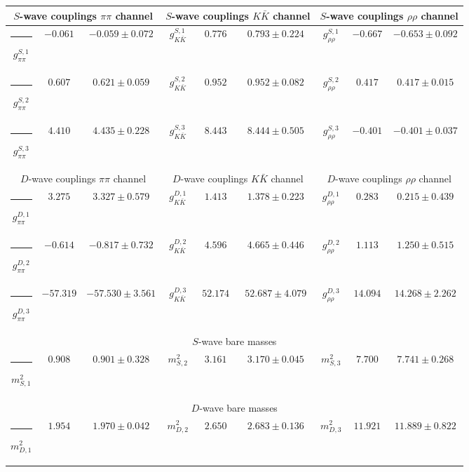 \begin{table}[h]
\begin{ruledtabular}
\begin{tabular}{c c c c c c c c c}
\multicolumn{3}{c}{$S$-wave couplings $\pi \pi$ channel}  & \multicolumn{3}{c}{$S$-wave couplings $K  \bar K$ channel} & \multicolumn{3}{c}{$S$-wave couplings $\rho\rho$ channel} \\ \hline
\rule[-0.2cm]{-0.1cm}{.55cm} $g^{S,1}_{\pi\pi}$ & $-0.061$ & $-0.059 \pm 0.072$ & $g^{S,1}_{K\bar K}$ & $0.776$ & $0.793 \pm 0.224$ & $g^{S,1}_{\rho\rho}$ & $-0.667$ & $-0.653 \pm 0.092$ \\
\rule[-0.2cm]{-0.1cm}{.55cm} $g^{S,2}_{\pi\pi}$ & $0.607$ & $0.621 \pm 0.059$ & $g^{S,2}_{K\bar K}$ & $0.952$ & $0.952 \pm 0.082$ & $g^{S,2}_{\rho\rho}$ & $0.417$ & $0.417 \pm 0.015$ \\
\rule[-0.2cm]{-0.1cm}{.55cm} $g^{S,3}_{\pi\pi}$ & $4.410$ & $4.435 \pm 0.228$ & $g^{S,3}_{K\bar K}$ & $8.443$ & $8.444 \pm 0.505$ & $g^{S,3}_{\rho\rho}$ & $-0.401$ & $-0.401 \pm 0.037$ \\
\hline 
\multicolumn{3}{c}{$D$-wave couplings $\pi \pi$ channel}  & \multicolumn{3}{c}{$D$-wave couplings $K  \bar K$ channel} & \multicolumn{3}{c}{$D$-wave couplings $\rho\rho$ channel} \\ \hline
\rule[-0.2cm]{-0.1cm}{.55cm} $g^{D,1}_{\pi\pi}$ & $3.275$ & $3.327 \pm 0.579$ & $g^{D,1}_{K\bar K}$ & $1.413$ & $1.378 \pm 0.223$ & $g^{D,1}_{\rho\rho}$ & $0.283$ & $0.215 \pm 0.439$ \\
\rule[-0.2cm]{-0.1cm}{.55cm} $g^{D,2}_{\pi\pi}$ & $-0.614$ & $-0.817 \pm 0.732$ & $g^{D,2}_{K\bar K}$ & $4.596$ & $4.665 \pm 0.446$ & $g^{D,2}_{\rho\rho}$ & $1.113$ & $1.250 \pm 0.515$ \\
\rule[-0.2cm]{-0.1cm}{.55cm} $g^{D,3}_{\pi\pi}$ & $-57.319$ & $-57.530 \pm 3.561$ & $g^{D,3}_{K\bar K}$ & $52.174$ & $52.687 \pm 4.079$ & $g^{D,3}_{\rho\rho}$ & $14.094$ & $14.268 \pm 2.262$ \\
\hline 
\multicolumn{9}{c}{$S$-wave bare masses}   \\ \hline
\rule[-0.2cm]{-0.1cm}{.55cm} $m^2_{S,1}$ & $0.908$ & $0.901 \pm 0.328$ & $m^2_{S,2}$ & $3.161$ & $3.170 \pm 0.045$ & $m^2_{S,3}$ & $7.700$ & $7.741 \pm 0.268$ \\
\hline 
\multicolumn{9}{c}{$D$-wave bare masses}   \\ \hline
\rule[-0.2cm]{-0.1cm}{.55cm} $m^2_{D,1}$ & $1.954$ & $1.970 \pm 0.042$ & $m^2_{D,2}$ & $2.650$ & $2.683 \pm 0.136$ & $m^2_{D,3}$ & $11.921$ & $11.889 \pm 0.822$ \\

\end{tabular}
\end{ruledtabular}
\end{table}
